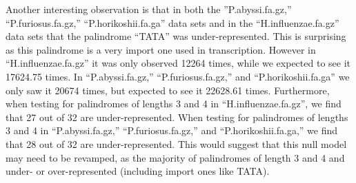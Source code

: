 \documentclass[11pt]{article}
\theoremstyle{definition}
\begin{document}
Another interesting observation is that in both the ''P.abyssi.fa.gz,'' ``P.furiosus.fa.gz,'' \newline  ``P.horikoshii.fa.ga'' data sets and in the ``H.influenzae.fa.gz'' data sets that the palindrome ``TATA'' was under-represented.  This is surprising as this palindrome is a very import one used in transcription.  However in  ``H.influenzae.fa.gz'' it was only observed 12264 times, while we expected to see it 17624.75 times.  In ``P.abyssi.fa.gz,'' ``P.furiosus.fa.gz,'' and  ``P.horikoshii.fa.ga'' we only saw it 20674 times, but expected to see it 22628.61 times.  Furthermore, when testing for palindromes of lengths 3 and 4 in ``H.influenzae.fa.gz'', we find that 27 out of 32 are under-represented.  When testing for palindromes of lengths 3 and 4 in ``P.abyssi.fa.gz,'' ``P.furiosus.fa.gz,'' and  ``P.horikoshii.fa.ga,'' we find that 28 out of 32 are under-represented.  This would suggest that this null model may need to be revamped, as the majority of palindromes of length 3 and 4 and under- or over-represented (including import ones like TATA).
\end{document}
